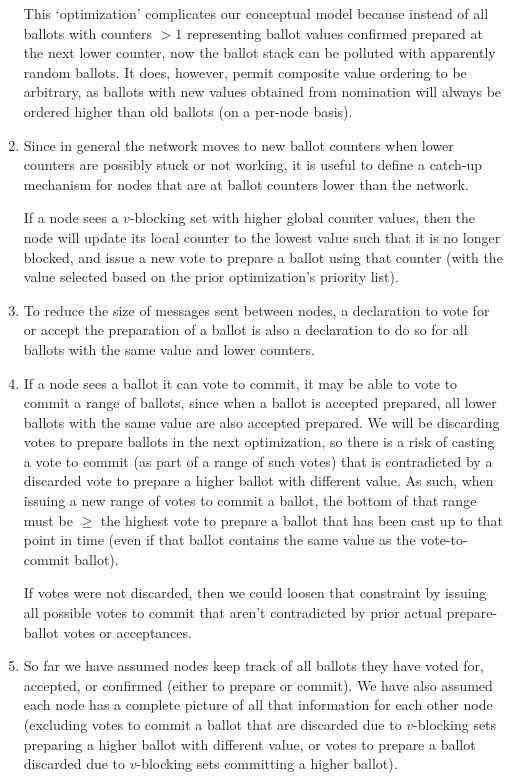 \begin{enumerate}
    This `optimization' complicates our conceptual model because instead of all ballots with counters $> 1$ representing ballot values confirmed prepared at the next lower counter, now the ballot stack can be polluted with apparently random ballots. It does, however, permit composite value ordering to be arbitrary, as ballots with new values obtained from nomination will always be ordered higher than old ballots (on a per-node basis).

    \item Since in general the network moves to new ballot counters when lower counters are possibly stuck or not working, it is useful to define a catch-up mechanism for nodes that are at ballot counters lower than the network.%

    If a node sees a $v$-blocking set with higher global counter values, then the node will update its local counter to the lowest value such that it is no longer blocked, and issue a new vote to prepare a ballot using that counter (with the value selected based on the prior optimization's priority list).

    \item To reduce the size of messages sent between nodes, a declaration to vote for or accept the preparation of a ballot is also a declaration to do so for all ballots with the same value and lower counters.

    \item If a node sees a ballot it can vote to commit, it may be able to vote to commit a range of ballots, since when a ballot is accepted prepared, all lower ballots with the same value are also accepted prepared. We will be discarding votes to prepare ballots in the next optimization, so there is a risk of casting a vote to commit (as part of a range of such votes) that is contradicted by a discarded vote to prepare a higher ballot with different value. As such, when issuing a new range of votes to commit a ballot, the bottom of that range must be $\geq$ the highest vote to prepare a ballot that has been cast up to that point in time (even if that ballot contains the same value as the vote-to-commit ballot).

    If votes were not discarded, then we could loosen that constraint by issuing all possible votes to commit that aren't contradicted by prior actual prepare-ballot votes or acceptances.

    \item So far we have assumed nodes keep track of all ballots they have voted for, accepted, or confirmed (either to prepare or commit). We have also assumed each node has a complete picture of all that information for each other node (excluding votes to commit a ballot that are discarded due to $v$-blocking sets preparing a higher ballot with different value, or votes to prepare a ballot discarded due to $v$-blocking sets committing a higher ballot).


\end{enumerate}
